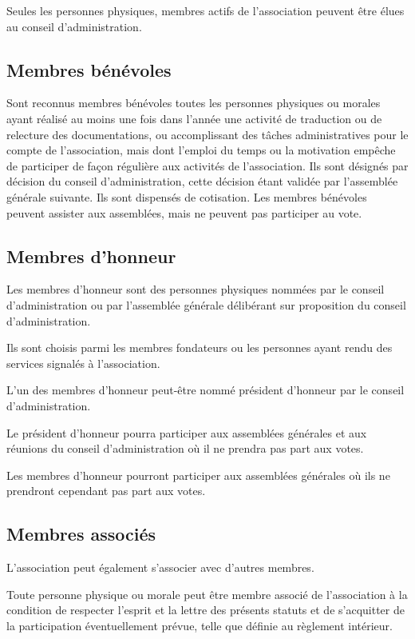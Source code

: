 \documentclass[a4wide,12pt]{scrartcl}
\begin{document}
Seules les personnes physiques, membres actifs de l'association
peuvent être élues au conseil d'administration.

\subsection{Membres bénévoles}

Sont reconnus membres bénévoles toutes les personnes physiques ou
morales ayant réalisé au moins une fois dans l'année une activité de
traduction ou de relecture des documentations, ou accomplissant des
tâches administratives pour le compte de l'association, mais dont
l'emploi du temps ou la motivation empêche de participer de façon
régulière aux activités de l'association. Ils sont désignés par
décision du conseil d'administration, cette décision étant validée par
l'assemblée générale suivante. Ils sont dispensés de cotisation. Les
membres bénévoles peuvent assister aux assemblées, mais ne peuvent pas
participer au vote.

\subsection{Membres d'honneur}

Les membres d'honneur sont des personnes physiques nommées par le
conseil d'administration ou par l'assemblée générale délibérant sur
proposition du conseil d'administration.

Ils sont choisis parmi les membres fondateurs ou les personnes ayant
rendu des services signalés à l'association.

L'un des membres d'honneur peut-être nommé président d'honneur par le
conseil d'administration.

Le président d'honneur pourra participer aux assemblées générales et
aux réunions du conseil d'administration où il ne prendra pas part aux
votes.

Les membres d'honneur pourront participer aux assemblées générales où
ils ne prendront cependant pas part aux votes.

\subsection{Membres associés}

L'association peut également s'associer avec d'autres membres.

Toute personne physique ou morale peut être membre associé de
l'association à la condition de respecter l'esprit et la lettre des
présents statuts et de s'acquitter de la participation éventuellement
prévue, telle que définie au règlement intérieur.
\end{document}
